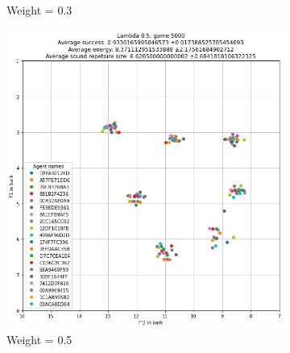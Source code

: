 \begin{figure}[ht]
\begin{subfigure}{.30\textwidth}
        \captionsetup{width=0.9\linewidth}
        \captionsetup{justification=centering}
        \caption{Weight = 0.3}
    \end{subfigure}
    \begin{subfigure}{.30\textwidth}
        \centering
        \includegraphics[width=\textwidth]{images/extra/bark_weight_4.png}
        \captionsetup{width=0.9\linewidth}
        \captionsetup{justification=centering}
        \caption{Weight = 0.5}
    \end{subfigure}
    \hspace{0.5cm}
    \begin{subfigure}{.30\textwidth}
        \centering

\end{subfigure}
\end{figure}
